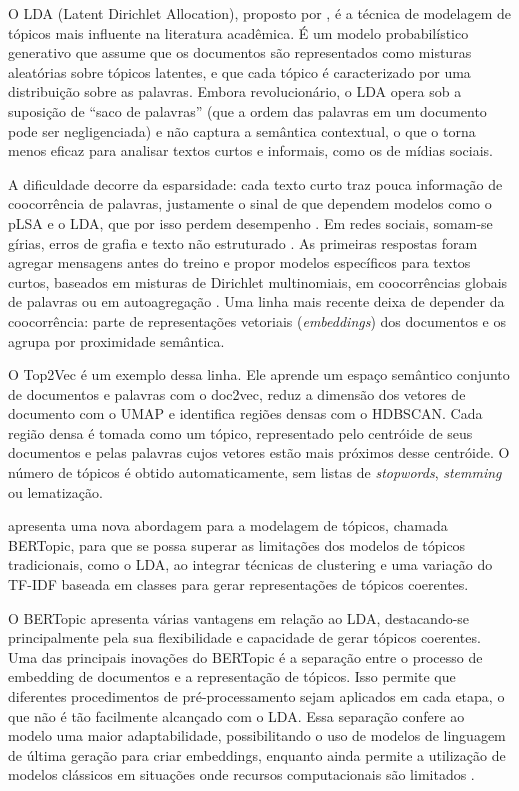 O LDA (Latent Dirichlet Allocation), proposto por , é a técnica de modelagem de tópicos mais influente na literatura acadêmica. É um modelo probabilístico generativo que assume que os documentos são representados como misturas aleatórias sobre tópicos latentes, e que cada tópico é caracterizado por uma distribuição sobre as palavras. Embora revolucionário, o LDA opera sob a suposição de ``saco de palavras'' (que a ordem das palavras em um documento pode ser negligenciada) e não captura a semântica contextual, o que o torna menos eficaz para analisar textos curtos e informais, como os de mídias sociais.

A dificuldade decorre da esparsidade: cada texto curto traz pouca informação de coocorrência de palavras, justamente o sinal de que dependem modelos como o pLSA e o LDA, que por isso perdem desempenho \cite{qiang2022}. Em redes sociais, somam-se gírias, erros de grafia e texto não estruturado \cite{albalawi2020}. As primeiras respostas foram agregar mensagens antes do treino \cite{hong2010} e propor modelos específicos para textos curtos, baseados em misturas de Dirichlet multinomiais, em coocorrências globais de palavras ou em autoagregação \cite{qiang2022}. Uma linha mais recente deixa de depender da coocorrência: parte de representações vetoriais (\emph{embeddings}) dos documentos e os agrupa por proximidade semântica.

O Top2Vec \cite{angelov2020} é um exemplo dessa linha. Ele aprende um espaço semântico conjunto de documentos e palavras com o doc2vec, reduz a dimensão dos vetores de documento com o UMAP e identifica regiões densas com o HDBSCAN. Cada região densa é tomada como um tópico, representado pelo centróide de seus documentos e pelas palavras cujos vetores estão mais próximos desse centróide. O número de tópicos é obtido automaticamente, sem listas de \emph{stopwords}, \emph{stemming} ou lematização.

 apresenta uma nova abordagem para a modelagem de tópicos, chamada BERTopic, para que se possa superar as limitações dos modelos de tópicos tradicionais, como o LDA, ao integrar técnicas de clustering e uma variação do TF-IDF baseada em classes para gerar representações de tópicos coerentes.

O BERTopic apresenta várias vantagens em relação ao LDA, destacando-se principalmente pela sua flexibilidade e capacidade de gerar tópicos coerentes. Uma das principais inovações do BERTopic é a separação entre o processo de embedding de documentos e a representação de tópicos. Isso permite que diferentes procedimentos de pré-processamento sejam aplicados em cada etapa, o que não é tão facilmente alcançado com o LDA. Essa separação confere ao modelo uma maior adaptabilidade, possibilitando o uso de modelos de linguagem de última geração para criar embeddings, enquanto ainda permite a utilização de modelos clássicos em situações onde recursos computacionais são limitados \cite{grootendorst2022}.

